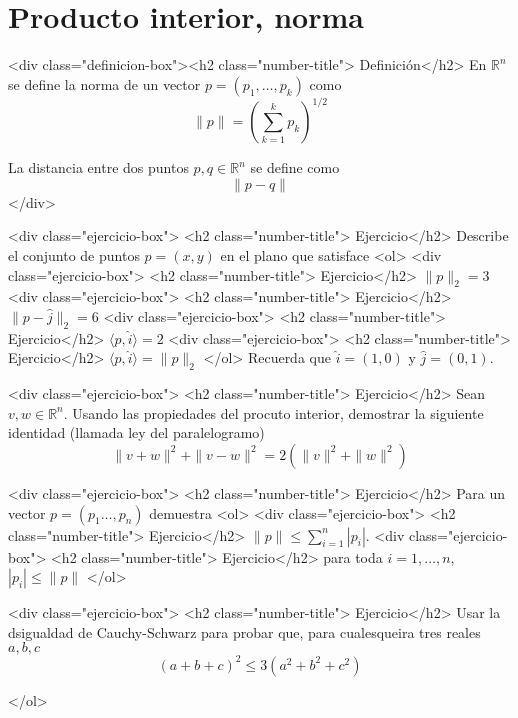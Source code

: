 \documentclass{article}
\theoremstyle{definition}
\begin{document}
       
       
       \section{Producto interior, norma}


	<div class="definicion-box"><h2 class="number-title">  Definición</h2>
	En $\mathbb{R}^n$ se define la norma de un vector $p=(p_1,\dots, p_k)$ como
	$$
		\|p\|=\left( \sum_{k=1}^k p_k\right)^{1/2}
	$$
	
	La distancia entre dos puntos $p,q \in \mathbb{R}^n$ se define como
	$$
	\|p-q\|	
	$$
	</div>
       
       <div class="ejercicio-box"> <h2 class="number-title"> Ejercicio</h2> Describe el conjunto de puntos $p=(x,y)$ en el  plano que satisface
         <ol>
         <div class="ejercicio-box"> <h2 class="number-title"> Ejercicio</h2> $\|p\|_2=3$
         <div class="ejercicio-box"> <h2 class="number-title"> Ejercicio</h2> $\|p-\hat{j}\|_2=6$
         <div class="ejercicio-box"> <h2 class="number-title"> Ejercicio</h2> $ \langle p, \hat{i} \rangle=2$
         <div class="ejercicio-box"> <h2 class="number-title"> Ejercicio</h2> $\langle p, \hat{i} \rangle = \|p\|_2$
         </ol>
         Recuerda que $\hat{i}=(1,0)$ y $\hat{j}=(0,1)$.



       <div class="ejercicio-box"> <h2 class="number-title"> Ejercicio</h2> Sean $v, w\in \mathbb{R}^n$.
       	Usando las propiedades del procuto interior, demostrar la siguiente identidad (llamada ley del paralelogramo)
         $$
         \|v+w\|^2+\|v-w\|^2=2(\|v\|^2+\|w\|^2)
         $$


        
			<div class="ejercicio-box"> <h2 class="number-title"> Ejercicio</h2> Para un vector $p=(p_1\dots, p_n) $ demuestra
			<ol>
			<div class="ejercicio-box"> <h2 class="number-title"> Ejercicio</h2> $	\|p\| \leq \sum_{i=1}^n|p_i| $. 
			<div class="ejercicio-box"> <h2 class="number-title"> Ejercicio</h2> para toda $i=1,\dots, n$, $|p_i| \leq \|p\|$
			</ol>
                
       <div class="ejercicio-box"> <h2 class="number-title"> Ejercicio</h2> Usar la dsigualdad de Cauchy-Schwarz para probar que, para cualesqueira tres
         reales $a,b,c$
         $$
         (a+b+c)^2 \leq 3(a^2+b^2+c^2)
         $$
         

       </ol>


  
       
\end{document}

